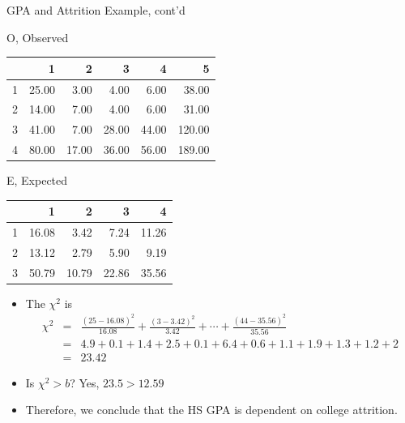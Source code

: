 \documentclass[14pt]{beamer}\usepackage[]{graphicx}\usepackage[]{color}
\begin{document}
\begin{frame}[fragile]{GPA and Attrition Example, cont'd}

\begin{minipage}[ht]{6cm}

{\tiny{

O, Observed 

\begin{table}[ht]
\centering
\begin{tabular}{rrrrrr}
  \hline
 & 1 & 2 & 3 & 4 & 5 \\ 
  \hline
1 & 25.00 & 3.00 & 4.00 & 6.00 & 38.00 \\ 
  2 & 14.00 & 7.00 & 4.00 & 6.00 & 31.00 \\ 
  3 & 41.00 & 7.00 & 28.00 & 44.00 & 120.00 \\ 
  4 & 80.00 & 17.00 & 36.00 & 56.00 & 189.00 \\ 
   \hline
\end{tabular}
\end{table}

}}
\end{minipage} \hfill
\begin{minipage}[ht]{5cm}

{\tiny{

E, Expected

\begin{table}[ht]
\centering
\begin{tabular}{rrrrr}
  \hline
 & 1 & 2 & 3 & 4 \\ 
  \hline
1 & 16.08 & 3.42 & 7.24 & 11.26 \\ 
  2 & 13.12 & 2.79 & 5.90 & 9.19 \\ 
  3 & 50.79 & 10.79 & 22.86 & 35.56 \\ 
   \hline
\end{tabular}
\end{table}

}}
\end{minipage}

\vspace{-4mm}

{\small{
\begin{itemize}
\item<1-> The $\chi^2$ is 
{\scriptsize{
\begin{eqnarray*}
\chi^2 &=& \frac{(25-16.08)^2}{16.08} + \frac{(3-3.42)^2}{3.42} + \cdots + \frac{(44-35.56)^2}{35.56} \\
&=& 4.9 + 0.1 + 1.4 + 2.5 + 0.1 + 6.4 + 0.6 + 1.1 + 1.9 + 1.3 + 1.2 + 2 \\
&=& 23.42  
\end{eqnarray*}
}}

\vspace{-6mm}

\item<2-> Is $\chi^2 > b$?  Yes, $23.5 > 12.59$ 

\item<3-> Therefore, we conclude that the HS GPA is dependent on  college attrition.
\end{itemize}
}}
\end{frame}
\end{document}
